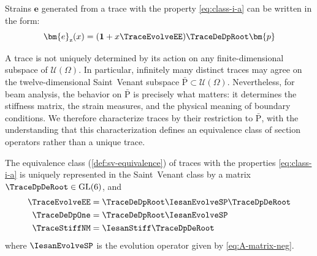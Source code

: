 Strains \(\bm{e}\) generated from a trace with the property \eqref{eq:class-i-a} can be written in the form:
\begin{equation}
\bm{e}_{\rm z}(x) 
=(\mathbf{1} + x\TraceEvolveEE)\TraceDeDpRoot\bm{p}
\label{eq:def-T0}
\end{equation}
\begin{remark}
A trace is not uniquely determined by its action on any finite-dimensional subspace of $\mathcal{U}(\Omega)$. 
In particular, infinitely many distinct traces may agree on the twelve-dimensional Saint~Venant subspace $\bar{\mathrm{P}} \subset \mathcal{U}(\Omega)$. Nevertheless, for beam analysis, the behavior on $\bar{\mathrm{P}}$ is precisely what matters: it determines the stiffness matrix, the strain measures, and the physical meaning of boundary conditions. 
We therefore characterize traces by their restriction to $\bar{\mathrm{P}}$, with the understanding that this characterization defines an equivalence class of section operators rather than a unique trace.
\end{remark}
\begin{proposition}\label{prop:trace-matrix}
The equivalence class (\cref{def:sv-equivalence}) of traces with the properties \eqref{eq:class-i-a} is uniquely represented in the Saint~Venant class by a matrix \(\TraceDpDeRoot \in\mathrm{GL}(6)\), and 
\begin{subequations}
    \begin{align} 
        \TraceEvolveEE &= \TraceDeDpRoot \IesanEvolveSP \TraceDpDeRoot \\
        \TraceDeDpOne &= \TraceDeDpRoot \IesanEvolveSP \label{eq:res-d1} \\
        \TraceStiffNM &= \IesanStiff \TraceDpDeRoot \label{eq:def-CT}
    \end{align}
\end{subequations}
where \(\IesanEvolveSP\) is the evolution operator given by \eqref{eq:A-matrix-neg}.
\end{proposition}


